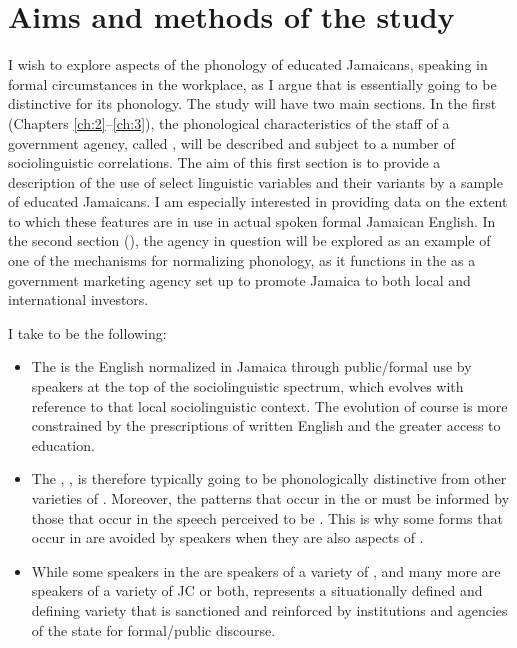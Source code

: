 \section{Aims and methods of the study}%

  I wish to explore aspects of the phonology of educated Jamaicans, speaking in formal circumstances in the workplace, as I argue that  is essentially going to be distinctive for its phonology.  The study will have two main sections.  In the first (Chapters \ref{ch:2}--\ref{ch:3}), the phonological characteristics of the staff of a government agency, called , will be described and subject to a number of sociolinguistic correlations.  The aim of this first section is to provide a description of the use of select linguistic variables and their variants by a sample of educated Jamaicans.  I am especially interested in providing data on the extent to which these features are in use in actual spoken formal Jamaican English.  In the second section (), the agency in question will be explored as an example of one of the mechanisms for normalizing  phonology, as it functions in the  as a government marketing agency set up to promote Jamaica to both local and international investors.

  I take  to be the following:

\begin{itemize}
\item The  is the English normalized in Jamaica through public\slash formal use by speakers at the top of the sociolinguistic spectrum, which evolves with reference to that local sociolinguistic context.  The evolution of course is more constrained by the prescriptions of written English and the greater access to education.  

\item The , , is therefore typically going to be phonologically distinctive from other varieties of .  Moreover, the patterns that occur in the  or  must be informed by those that occur in the speech perceived to be .  This is why some forms that occur in  are avoided by  speakers when they are also aspects of .

\item While some speakers in the  are  speakers of a variety of , and many more are  speakers of a variety of JC or both,  represents a situationally defined and defining variety that is sanctioned and reinforced by institutions and agencies of the state for formal\slash  public discourse.    
\end{itemize}

